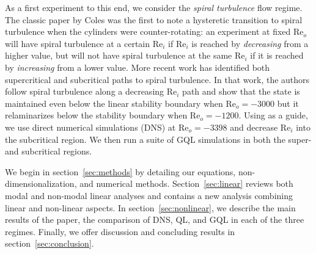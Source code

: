 \documentclass[openacc]{rstransa}%
\newcommand{\Reyn}{\mathrm{Re}}
\begin{document}
As a first experiment to this end, we consider the \emph{spiral turbulence} flow regime. The classic paper by Coles \cite{1965JFM....21..385C} was the first to note a hysteretic transition to spiral turbulence when the cylinders were counter-rotating: an experiment at fixed $\Reyn_o$ will have spiral turbulence at a certain $\Reyn_i$ if $\Reyn_i$ is reached by \emph{decreasing} from a higher value, but will not have spiral turbulence at the same $\Reyn_i$ if it is reached by \emph{increasing} from a lower value. More recent work has identified both supercritical and subcritical paths to spiral turbulence\cite{2009PhRvE..80d6315M}. In that work, the authors follow spiral turbulence along a decreasing $\Reyn_i$ path and show that the state is maintained even below the linear stability boundary when $\Reyn_o = -3000$ but it relaminarizes below the stability boundary when $\Reyn_o = -1200$.
Using \cite{2009PhRvE..80d6315M} as a guide, we use direct numerical simulations (DNS) at $\Reyn_o = -3398$ and decrease $\Reyn_i$ into the subcritical region. We then run a suite of GQL simulations in both the super- and subcritical regions.

We begin in section~\ref{sec:methods} by detailing our equations, non-dimensionalization, and numerical methods. Section~\ref{sec:linear} reviews both modal and non-modal linear analyses and contains a new analysis combining linear and non-linear aspects. In section~\ref{sec:nonlinear}, we describe the main results of the paper, the comparison of DNS, QL, and GQL in each of the three regimes. Finally, we offer discussion and concluding results in section~\ref{sec:conclusion}.
\end{document}

